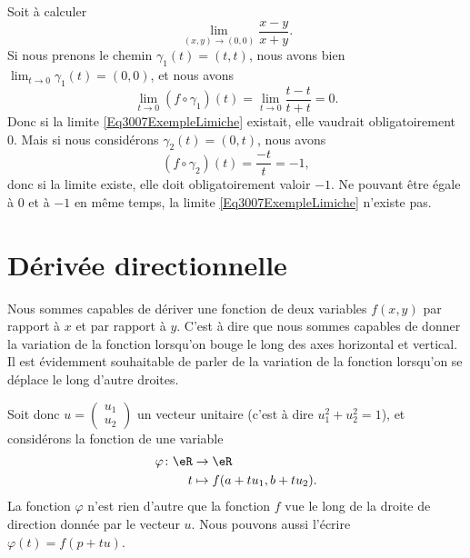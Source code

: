 \begin{example}
	Soit à calculer
	\begin{equation}	\label{Eq3007ExempleLimiche}
		\lim_{(x,y)\to(0,0)}\frac{ x-y }{ x+y }.
	\end{equation}
	Si nous prenons le chemin $\gamma_1(t)=(t,t)$, nous avons bien $\lim_{t\to 0} \gamma_1(t)=(0,0)$, et nous avons
	\begin{equation}
		\lim_{t\to 0} (f\circ\gamma_1)(t)=\lim_{t\to 0} \frac{ t-t }{ t+t }=0.
	\end{equation}
	Donc si la limite \eqref{Eq3007ExempleLimiche} existait, elle vaudrait obligatoirement $0$. Mais si nous considérons $\gamma_2(t)=(0,t)$, nous avons
	\begin{equation}
		(f\circ\gamma_2)(t)=\frac{ -t }{ t }=-1,
	\end{equation}
	donc si la limite existe, elle doit obligatoirement valoir $-1$. Ne pouvant être égale à $0$ et à $-1$ en même temps, la limite \eqref{Eq3007ExempleLimiche} n'existe pas.
\end{example}

\section{Dérivée directionnelle}

Nous sommes capables de dériver une fonction de deux variables $f(x,y)$ par rapport à $x$ et par rapport à $y$. C'est à dire que nous sommes capables de donner la variation de la fonction lorsqu'on bouge le long des axes horizontal et vertical. Il est évidemment souhaitable de parler de la variation de la fonction lorsqu'on se déplace le long d'autre droites.

Soit donc $u=\begin{pmatrix}
    u_1    \\
    u_2
\end{pmatrix}$ un vecteur unitaire (c'est à dire $u_1^2+u_2^2=1$), et considérons la fonction de une variable
\begin{equation}
    \begin{aligned}
        \varphi\colon \eR&\to \eR \\
        t&\mapsto f(a+tu_1,b+tu_2).
    \end{aligned}
\end{equation}
La fonction $\varphi$ n'est rien d'autre que la fonction $f$ vue le long de la droite de direction donnée par le vecteur $u$. Nous pouvons aussi l'écrire $\varphi(t)=f(p+tu)$.

